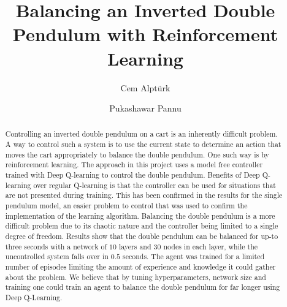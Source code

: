 \documentclass[final]{LTHtwocol} %
\begin{document}
\begin{frontmatter}
\title{Balancing an Inverted Double Pendulum with Reinforcement Learning} %

\author[cem]{Cem Alpt\"urk}
\author[pukashawar]{Pukashawar Pannu}


\begin{abstract}
    Controlling an inverted double pendulum on a cart is an inherently difficult problem.
    A way to control such a system is to use the current state to determine an action that moves the cart appropriately to balance the double pendulum.
    One such way is by reinforcement learning.
    The approach in this project uses a model free controller trained with Deep Q-learning to control the double pendulum.
    Benefits of Deep Q-learning over regular Q-learning is that the controller can be used for situations that are not presented during training.
    This has been confirmed in the results for the single pendulum model, an easier problem to control that was used to confirm the implementation of the learning algorithm.
    Balancing the double pendulum is a more difficult problem due to its chaotic nature and the controller being limited to a single degree of freedom.
    Results show that the double pendulum can be balanced for up-to three seconds with a network of $10$ layers and $30$ nodes in each layer, while the uncontrolled system falls over in $0.5$ seconds.
    The agent was trained for a limited number of episodes limiting the amount of experience and knowledge it could gather about the problem.
    We believe that by tuning hyperparameters, network size and training one could train an agent to balance the double pendulum for far longer using Deep Q-Learning.
\end{abstract}

\end{frontmatter}

\end{document}
